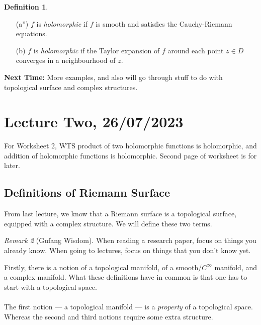 \documentclass[a4paper]{report}
\theoremstyle{definition}
\newtheorem{definition}{Definition}
\theoremstyle{remark}
\newtheorem{remark}{Remark}
\theoremstyle{proposition}
\theoremstyle{conjecture}
\theoremstyle{lemma}
\theoremstyle{corollary}
\newtheorem{corollary}{Corollary}
\theoremstyle{exercise}
\theoremstyle{example}
\begin{document}
\begin{definition}
\begin{itemize}
\begin{remark}
\begin{corollary}
                    If $f$ is holomorphic, then as a real function $f$ is 
                    smooth.
                \end{corollary}
                This leads to the next definition:
            \end{remark}
        \item[(a'')] $f$ is \emph{holomorphic} if $f$ is smooth and satisfies
            the Cauchy-Riemann equations. 
        \item[(b)] $f$ is \emph{holomorphic} if the Taylor expansion of $f$ 
            around each point $z\in D$ converges in a neighbourhood of $z$.
    \end{itemize}
\end{definition}

\textbf{Next Time:} More examples, and also will go through stuff to do with topological surface and complex structures.

\section{Lecture Two, 26/07/2023}

For Worksheet 2, WTS product of two holomorphic functions is holomorphic,
and addition of holomorphic functions is holomorphic. Second page of worksheet
is for later. 

\subsection{Definitions of Riemann Surface}

From last lecture, we know that a Riemann surface is a topological surface, 
equipped with a complex structure. We will define these two terms. 

\begin{remark}[Gufang Wisdom]
    When reading a research paper, focus on things you already know. When 
    going to lectures, focus on things that you don't know yet.
\end{remark}

Firstly, there is a notion of a topological manifold,
of a smooth/$C^\infty$ manifold, and a complex manifold. What these definitions
have in common is that one has to start with a topological space. \\\\
The first notion --- a topological manifold --- is a \emph{property} of a 
topological space. Whereas the second and third notions require some extra
structure.
\end{document}
